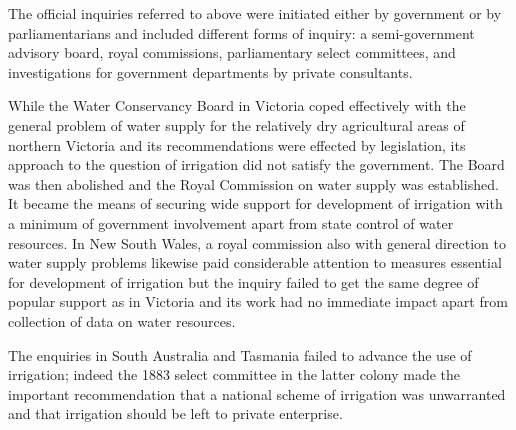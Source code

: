 The official inquiries referred to above were initiated either by
government or by parliamentarians and included different forms of
inquiry: a semi-government advisory board, royal commissions,
parliamentary select committees, and investigations for government
departments by private consultants.

While the Water Conservancy Board in Victoria coped effectively with
the general problem of water supply for the relatively dry
agricultural areas of northern Victoria and its recommendations were
effected by legislation, its approach to the question of irrigation
did not satisfy the government.  The Board was then abolished and the
Royal Commission on water supply was established.  It became the
means of securing wide support for development of irrigation with a
minimum of government involvement apart from state control of water
resources.  In New South Wales, a royal commission also with general
direction to water supply problems likewise paid considerable
attention to measures essential for development of irrigation but the
inquiry failed to get the same degree of popular support as in
Victoria and its work had no immediate impact apart from collection of
data on water resources.

The enquiries in South Australia and Tasmania failed to advance the
use of irrigation; indeed the 1883 select committee in the latter
colony made the important recommendation that a national scheme of
irrigation was unwarranted and that irrigation should be left to
private enterprise.

